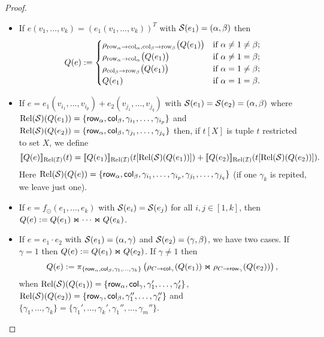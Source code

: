 \begin{proof}
\begin{itemize}

  \item If $e(v_1,\ldots,v_k)=(e_1(v_1,\ldots,v_k))^T$ with $\mathcal{S} (e_1)=(\alpha, \beta)$ then \[
Q(e) :=
\begin{cases}
\rho_{\mathrm{row}_\alpha \to \mathrm{col}_\alpha,\mathrm{col}_\beta \to \mathrm{row}_\beta}\bigl(Q(e_1)\bigr) & \text{if } \alpha \neq 1 \neq \beta; \cr
\rho_{\mathrm{row}_\alpha \to \mathrm{col}_\alpha}\bigl(Q(e_1)\bigr) & \text{if } \alpha \neq 1 = \beta; \cr
\rho_{\mathrm{col}_\beta \to \mathrm{row}_\beta}\bigl(Q(e_1)\bigr) & \text{if } \alpha = 1 \neq \beta; \cr
Q(e_1) & \text{if } \alpha = 1 = \beta.
\end{cases}
\]
	\item If $e=e_1(v_{i_{1}},\ldots,v_{i_p})+e_2(v_{j_1},\ldots,v_{j_q})$ with $\mathcal{S} (e_1)=\mathcal{S} (e_2)=(\alpha, \beta)$ 
	where $\text{Rel}(\mathcal{S})(Q(e_1))=\lbrace\mathsf{row}_\alpha,\mathsf{col}_\beta, \gamma_{i_{1}}, \ldots, \gamma_{i_{p}} \rbrace$
	and $\text{Rel}(\mathcal{S})(Q(e_2))=\lbrace\mathsf{row}_\alpha,\mathsf{col}_\beta, \gamma_{j_{1}}, \ldots, \gamma_{j_{q}} \rbrace$
	then, if $t[X]$ is tuple $t$ restricted to set $X$, we define
	$$
	\llbracket Q(e) \rrbracket_{\text{Rel}(\mathcal{I})}(t)=\llbracket Q(e_1) \rrbracket_{\text{Rel}(\mathcal{I})}(t[\text{Rel}(\mathcal{S})(Q(e_1))]) + \llbracket Q(e_2) \rrbracket_{\text{Rel}(\mathcal{I})}(t[\text{Rel}(\mathcal{S})(Q(e_2))]).
	$$
	Here $\text{Rel}(\mathcal{S})(Q(e))=\lbrace\mathsf{row}_\alpha,\mathsf{col}_\beta, \gamma_{i_{1}}, \ldots, \gamma_{i_{p}}, \gamma_{j_{1}}, \ldots, \gamma_{j_{q}} \rbrace$ (if one $\gamma_{k}$ is repited, we leave just one).

  \item If $e=f_\odot(e_1,\ldots, e_k)$ with $\mathcal{S}(e_i)=\mathcal{S}(e_j)$ for all $i,j\in[1,k]$, then $Q(e):=Q(e_1)\Join \cdots \Join Q(e_k)$.

  \item If $e=e_1\cdot e_2$ with $\mathcal{S} (e_1)=(\alpha, \gamma)$ and $\mathcal{S} (e_2)=(\gamma, \beta)$, we have two cases. If $\gamma = 1$ then $Q (e):=Q (e_1)\Join Q (e_2)$.
If $\gamma\neq 1$ then
$$
Q (e) := \pi_{\lbrace \mathsf{row}_{\alpha},\mathsf{col}_{\beta}, \gamma_1,\ldots,\gamma_k \rbrace}\left(\rho_{C\to \mathsf{col}_\gamma}(Q (e_1))\Join \rho_{C\to \mathsf{row}_\gamma}(Q (e_2)) \right),
$$
when $\text{Rel}(\mathcal{S})(Q(e_1))=\{\mathsf{row}_\alpha,\mathsf{col}_\gamma,\gamma_1',\ldots,\gamma_{\ell}'\}$,
$\text{Rel}(\mathcal{S})(Q(e_2))=\{\mathsf{row}_\gamma,\mathsf{col}_\beta,\gamma_1'',\ldots,\gamma_{\ell}''\}$ and $\{\gamma_1,\ldots,\gamma_k\}=\{\gamma_1',\ldots,\gamma_k',\gamma_1'',\ldots,\gamma_m''\}$.



\end{itemize}
\end{proof}
